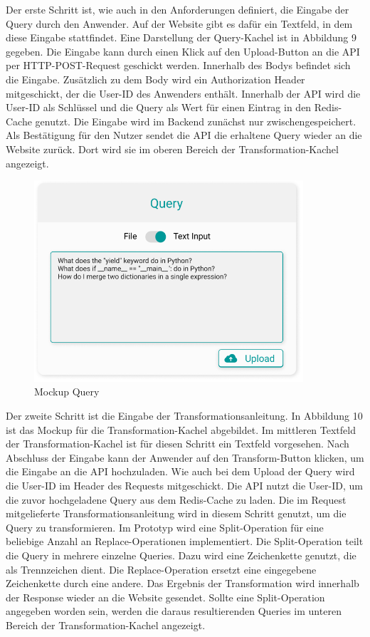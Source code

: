 Der erste Schritt ist, wie auch in den Anforderungen definiert, die Eingabe der Query durch den Anwender. Auf der Website gibt es dafür ein Textfeld, in dem diese Eingabe stattfindet. Eine Darstellung der Query-Kachel ist in Abbildung 9 gegeben. Die Eingabe kann durch einen Klick auf den Upload-Button an die API per HTTP-POST-Request geschickt werden. Innerhalb des Bodys befindet sich die Eingabe. Zusätzlich zu dem Body wird ein Authorization Header mitgeschickt, der die User-ID des Anwenders enthält. Innerhalb der API wird die User-ID als Schlüssel und die Query als Wert für einen Eintrag in den Redis-Cache genutzt. Die Eingabe wird im Backend zunächst nur zwischengespeichert. Als Bestätigung für den Nutzer sendet die API die erhaltene Query wieder an die Website zurück. Dort wird sie im oberen Bereich der Transformation-Kachel angezeigt. 

\begin{figure}[H]
  \centering
    \includegraphics[width = 10cm]{bilder/mockupQuery}
    \caption{Mockup Query}
\end{figure}

Der zweite Schritt ist die Eingabe der Transformationsanleitung. In Abbildung 10 ist das Mockup für die Transformation-Kachel abgebildet. Im mittleren Textfeld der Transformation-Kachel ist für diesen Schritt ein Textfeld vorgesehen. Nach Abschluss der Eingabe kann der Anwender auf den Transform-Button klicken, um die Eingabe an die API hochzuladen. Wie auch bei dem Upload der Query wird die User-ID im Header des Requests mitgeschickt. Die API nutzt die User-ID, um die zuvor hochgeladene Query aus dem Redis-Cache zu laden. Die im Request mitgelieferte Transformationsanleitung wird in diesem Schritt genutzt, um die Query zu transformieren. Im Prototyp wird eine Split-Operation für eine beliebige Anzahl an Replace-Operationen implementiert. Die Split-Operation teilt die Query in mehrere einzelne Queries. Dazu wird eine Zeichenkette genutzt, die als Trennzeichen dient. Die Replace-Operation ersetzt eine eingegebene Zeichenkette durch eine andere. Das Ergebnis der Transformation wird innerhalb der Response wieder an die Website gesendet. Sollte eine Split-Operation angegeben worden sein, werden die daraus resultierenden Queries im unteren Bereich der Transformation-Kachel angezeigt. 


